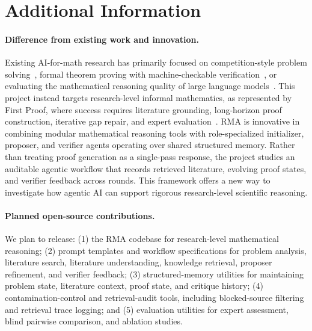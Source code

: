 \documentclass[11pt]{article}
\begin{document}
\vspace{-4pt}
\vspace{-4pt}
\section*{Additional Information}
\vspace{-4pt}

\paragraph{Difference from existing work and innovation.}
Existing AI-for-math research has primarily focused on competition-style problem solving~\citep{hendrycks2021math,trinh2024alphageometry}, formal theorem proving with machine-checkable verification~\citep{Lean4,polu2020gpt,yang2023leandojo}, or evaluating the mathematical reasoning quality of large language models~\citep{frieder2024mathematical}. This project instead targets research-level informal mathematics, as represented by First Proof, where success requires literature grounding, long-horizon proof construction, iterative gap repair, and expert evaluation~\citep{abouzaid2026first,aletheia}. RMA is innovative in combining modular mathematical reasoning tools with role-specialized initializer, proposer, and verifier agents operating over shared structured memory. Rather than treating proof generation as a single-pass response, the project studies an auditable agentic workflow that records retrieved literature, evolving proof states, and verifier feedback across rounds. This framework offers a new way to investigate how agentic AI can support rigorous research-level scientific reasoning.

\vspace{-6pt}
\paragraph{Planned open-source contributions.}
We plan to release: (1) the RMA codebase for research-level mathematical reasoning; (2) prompt templates and workflow specifications for problem analysis, literature search, literature understanding, knowledge retrieval, proposer refinement, and verifier feedback; (3) structured-memory utilities for maintaining problem state, literature context, proof state, and critique history; (4) contamination-control and retrieval-audit tools, including blocked-source filtering and retrieval trace logging; and (5) evaluation utilities for expert assessment, blind pairwise comparison, and ablation studies.
\end{document}
